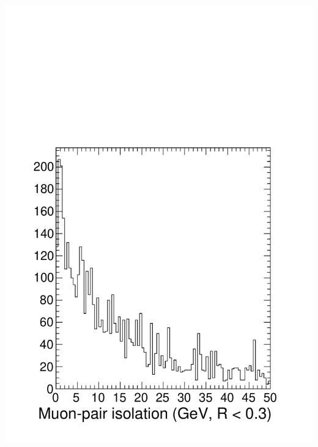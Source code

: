 \documentclass[compress]{beamer}
\begin{document}
\begin{frame}
\begin{columns}
\includegraphics[width=\linewidth]{bubbleiso_background.pdf}
\end{columns}
\end{frame}
\end{document}
